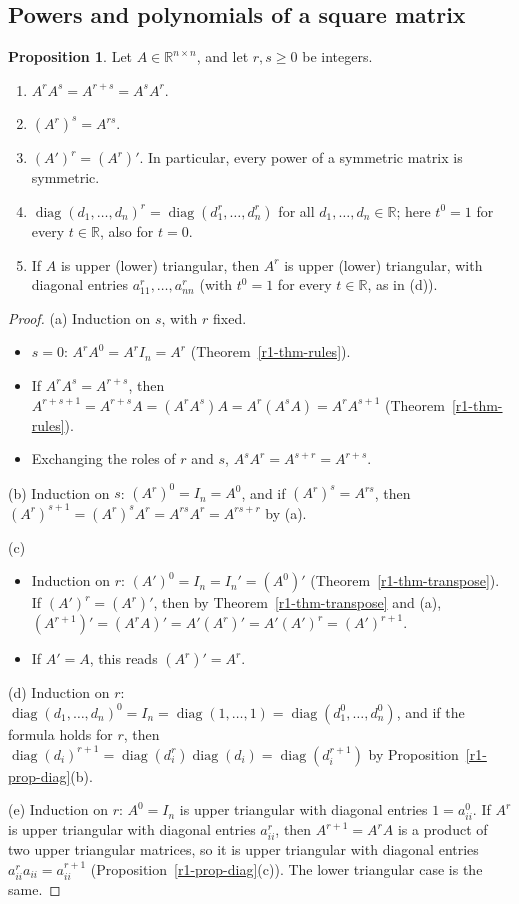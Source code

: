 \documentclass[12pt]{article}
\newcommand{\R}{\mathbb R}
\DeclareMathOperator{\diag}{diag}
\theoremstyle{definition}
\newtheorem{proposition}[theorem]{Proposition}
\begin{document}
\subsection*{Powers and polynomials of a square matrix}

\begin{proposition}\label{r1-prop-powers}
Let \(A\in\R^{n\times n}\), and let \(r,s\geqslant0\) be integers.
\begin{enumerate}
\item \(A^rA^s=A^{r+s}=A^sA^r\).
\item \((A^r)^s=A^{rs}\).
\item \((A')^r=(A^r)'\). In particular, every power of a symmetric matrix is symmetric.
\item \(\diag(d_1,\dots,d_n)^r=\diag(d_1^r,\dots,d_n^r)\) for all \(d_1,\dots,d_n\in\R\); here \(t^0=1\) for every
\(t\in\R\), also for \(t=0\).
\item If \(A\) is upper (lower) triangular, then \(A^r\) is upper (lower) triangular, with diagonal entries
\(a_{11}^r,\dots,a_{nn}^r\) (with \(t^0=1\) for every \(t\in\R\), as in (d)).
\end{enumerate}
\end{proposition}
\begin{proof}
(a) Induction on \(s\), with \(r\) fixed.
\begin{itemize}
\item \(s=0\): \(A^rA^0=A^rI_n=A^r\) (Theorem~\ref{r1-thm-rules}).
\item If \(A^rA^s=A^{r+s}\), then \(A^{r+s+1}=A^{r+s}A=(A^rA^s)A=A^r(A^sA)=A^rA^{s+1}\) (Theorem~\ref{r1-thm-rules}).
\item Exchanging the roles of \(r\) and \(s\), \(A^sA^r=A^{s+r}=A^{r+s}\).
\end{itemize}
(b) Induction on \(s\): \((A^r)^0=I_n=A^0\), and if \((A^r)^s=A^{rs}\), then
\((A^r)^{s+1}=(A^r)^sA^r=A^{rs}A^r=A^{rs+r}\) by (a).

(c)
\begin{itemize}
\item Induction on \(r\): \((A')^0=I_n=I_n'=(A^0)'\) (Theorem~\ref{r1-thm-transpose}). If \((A')^r=(A^r)'\), then
by Theorem~\ref{r1-thm-transpose}
and (a), \((A^{r+1})'=(A^rA)'=A'(A^r)'=A'(A')^r=(A')^{r+1}\).
\item If \(A'=A\), this reads \((A^r)'=A^r\).
\end{itemize}
(d) Induction on \(r\): \(\diag(d_1,\dots,d_n)^0=I_n=\diag(1,\dots,1)=\diag(d_1^0,\dots,d_n^0)\), and if the formula
holds for \(r\), then \(\diag(d_i)^{r+1}=\diag(d_i^r)\diag(d_i)=\diag(d_i^{r+1})\) by
Proposition~\ref{r1-prop-diag}(b).

(e) Induction on \(r\): \(A^0=I_n\) is upper triangular with diagonal entries \(1=a_{ii}^0\). If \(A^r\) is upper
triangular with diagonal entries \(a_{ii}^r\), then \(A^{r+1}=A^rA\) is a product of two upper triangular matrices,
so it is upper triangular with diagonal entries \(a_{ii}^ra_{ii}=a_{ii}^{r+1}\) (Proposition~\ref{r1-prop-diag}(c)).
The lower triangular case is the same.
\end{proof}
\end{document}
